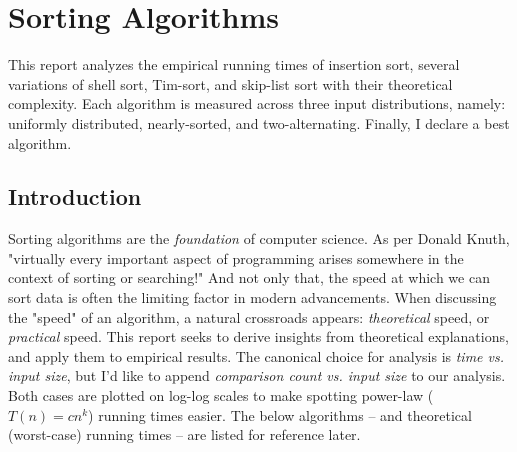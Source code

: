 \section{Sorting Algorithms}
This report analyzes the empirical running times of insertion sort, several variations of shell sort, Tim-sort, and skip-list sort with their theoretical complexity. Each algorithm is measured across three input distributions, namely: uniformly distributed, nearly-sorted, and two-alternating. Finally, I declare a best algorithm.

\subsection{Introduction}
Sorting algorithms are the \emph{foundation} of computer science. As per Donald Knuth, "virtually every important aspect of programming arises somewhere in the context of sorting or searching!" And not only that, the speed at which we can sort data is often the limiting factor in modern advancements.
When discussing the "speed" of an algorithm, a natural crossroads appears: \emph{theoretical} speed, or \emph{practical} speed. This report seeks to derive insights from theoretical explanations, and apply them to empirical results. The canonical choice for analysis is \emph{time vs. input size}, but I'd like to append \emph{comparison count vs. input size} to our analysis. Both cases are plotted on log-log scales to make spotting power-law ($T(n) = cn^k$) running times easier. The below algorithms -- and theoretical (worst-case) running times -- are listed for reference later.

